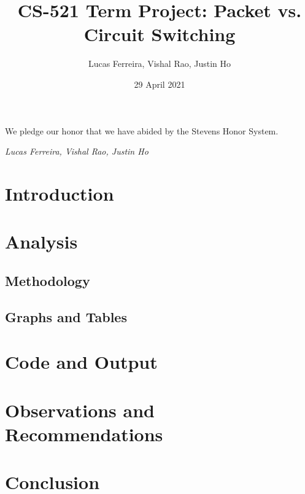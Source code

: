 \documentclass{article}
\title{CS-521 Term Project: Packet vs. Circuit Switching}
\author{Lucas Ferreira, Vishal Rao, Justin Ho}
\date{29 April 2021}
\begin{document}
  \maketitle

  {\flushleft We pledge our honor that we have abided by the Stevens Honor System.

  \textit{Lucas Ferreira, Vishal Rao, Justin Ho}}

  \section{Introduction}



  \section{Analysis}

  \subsection{Methodology}

  

  \subsection{Graphs and Tables}



  \section{Code and Output}



  \section{Observations and Recommendations}



  \section{Conclusion}
\end{document}
